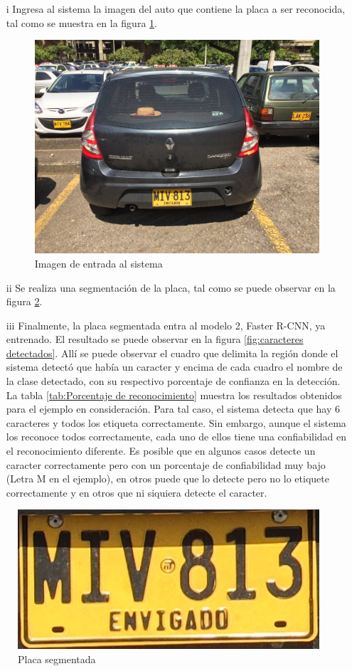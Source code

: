 \begin{itemize}
    
    \item[i] Ingresa al sistema la imagen del auto que contiene la placa a ser reconocida, tal como se muestra en la figura \ref{fig:Cargamos imagen deteccion}.

\begin{figure}[H]
\centering
\includegraphics[width=0.6\linewidth]{imagenes/RESULTADOS/carro_detec.JPG}
\caption{Imagen de entrada al sistema}
\label{fig:Cargamos imagen deteccion}
\end{figure}

\item[ii] Se realiza una segmentación de la placa, tal como se puede observar en la figura \ref{fig:Placa segmentada}.

\item[iii] Finalmente, la placa segmentada entra al modelo 2, Faster R-CNN, ya entrenado. El resultado se puede observar en la figura \ref{fig:caracteres detectados}. Allí se puede observar el cuadro que delimita la región donde el sistema detectó que había un caracter y encima de cada cuadro el nombre de la clase detectado, con su respectivo porcentaje de confianza en la detección. La tabla \ref{tab:Porcentaje de reconocimiento} muestra los resultados obtenidos para el ejemplo en consideración. Para tal caso, el sistema detecta que hay 6 caracteres y todos los etiqueta correctamente. Sin embargo, aunque el sistema los reconoce todos correctamente, cada uno de ellos tiene una confiabilidad en el reconocimiento diferente. Es posible que en algunos casos detecte un caracter correctamente pero con un porcentaje de confiabilidad muy bajo (Letra M en el ejemplo), en otros puede que lo detecte pero no lo etiquete correctamente y en otros que ni siquiera detecte el caracter. 
\end{itemize}

\begin{figure}[H]
\centering
\includegraphics[width=0.5\linewidth]{imagenes/RESULTADOS/placa_carro_detec.JPG}
\caption{Placa segmentada}
\label{fig:Placa segmentada}
\end{figure}

